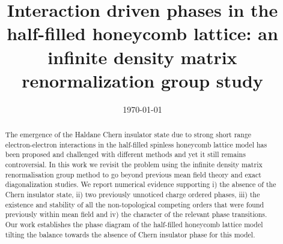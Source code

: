 \documentclass[aps,prx,10pt,twocolumn,floatfix,superscriptaddress,showpacs,numerical,footinbib]{revtex4-1}
\newcommand{\noteAG}[1]{{\color{blue} [AG: #1]}}
\newcommand{\noteFP}[1]{{\color{magenta} [FP: #1]}}
\newcommand{\noteJM}[1]{{\color{red} [JM: #1]}}
\newcommand{\noteFdJ}[1]{{\color{cyan} [FdJ: #1]}}
\begin{document}
%
\title{Interaction driven phases in the half-filled honeycomb lattice: an infinite density matrix renormalization group study}
%
%
\date{\today}
%
\begin{abstract}
%
%
The emergence of the Haldane Chern insulator state due to strong short range electron-electron interactions in the half-filled spinless honeycomb lattice
model has been proposed and challenged with different methods and yet it still remains controversial.
%
In this work we revisit the problem using the infinite density matrix renormalisation group method to go beyond previous mean field theory and exact
diagonalization studies.
%
We report numerical evidence supporting 
i) the absence of the Chern insulator state, 
ii) two previously unnoticed charge ordered phases, 
iii) the existence and stability of all the non-topological competing orders that were found previously within mean field and
iv) the character of the relevant phase transitions.
%
Our work establishes the phase diagram of the half-filled honeycomb lattice model tilting the balance
towards the absence of Chern insulator phase for this model.
%
%
\end{abstract}
%
\maketitle
%
\end{document}
